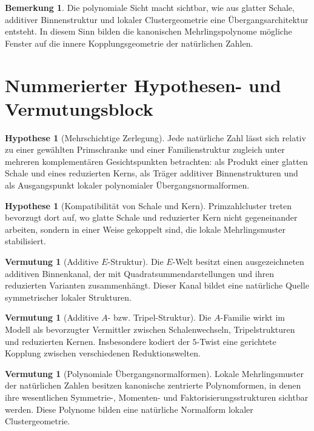 \documentclass[11pt,a4paper]{article}
\theoremstyle{definition}
\newtheorem{bemerkung}[satz]{Bemerkung}
\newtheorem{hypothese}[satz]{Hypothese}
\newtheorem{vermutung}[satz]{Vermutung}
\begin{document}
\begin{bemerkung}
Die polynomiale Sicht macht sichtbar, wie aus glatter Schale, additiver Binnenstruktur und lokaler Clustergeometrie eine Übergangsarchitektur entsteht. In diesem Sinn bilden die kanonischen Mehrlingspolynome mögliche Fenster auf die innere Kopplungsgeometrie der natürlichen Zahlen.
\end{bemerkung}

\section{Nummerierter Hypothesen- und Vermutungsblock}

\begin{hypothese}[Mehrschichtige Zerlegung]
Jede natürliche Zahl lässt sich relativ zu einer gewählten Primschranke und einer Familienstruktur zugleich unter mehreren komplementären Gesichtspunkten betrachten: als Produkt einer glatten Schale und eines reduzierten Kerns, als Träger additiver Binnenstrukturen und als Ausgangspunkt lokaler polynomialer Übergangsnormalformen.
\end{hypothese}

\begin{hypothese}[Kompatibilität von Schale und Kern]
Primzahlcluster treten bevorzugt dort auf, wo glatte Schale und reduzierter Kern nicht gegeneinander arbeiten, sondern in einer Weise gekoppelt sind, die lokale Mehrlingsmuster stabilisiert.
\end{hypothese}

\begin{vermutung}[Additive \(E\)-Struktur]
Die \(E\)-Welt besitzt einen ausgezeichneten additiven Binnenkanal, der mit Quadratsummendarstellungen und ihren reduzierten Varianten zusammenhängt. Dieser Kanal bildet eine natürliche Quelle symmetrischer lokaler Strukturen.
\end{vermutung}

\begin{vermutung}[Additive \(A\)- bzw. Tripel-Struktur]
Die \(A\)-Familie wirkt im Modell als bevorzugter Vermittler zwischen Schalenwechseln, Tripelstrukturen und reduzierten Kernen. Insbesondere kodiert der \(5\)-Twist eine gerichtete Kopplung zwischen verschiedenen Reduktionswelten.
\end{vermutung}

\begin{vermutung}[Polynomiale Übergangsnormalformen]
Lokale Mehrlingsmuster der natürlichen Zahlen besitzen kanonische zentrierte Polynomformen, in denen ihre wesentlichen Symmetrie-, Momenten- und Faktorisierungsstrukturen sichtbar werden. Diese Polynome bilden eine natürliche Normalform lokaler Clustergeometrie.
\end{vermutung}
\end{document}
